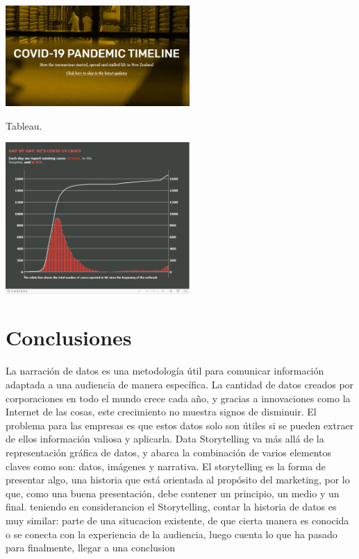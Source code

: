 \documentclass[twoside,twocolumn]{article}
\begin{document}
\includegraphics[width=7cm]{imagenes/img13.png}

Tableau. 

\includegraphics[width=7cm]{imagenes/img14.png}

\section{Conclusiones}
La narración de datos es una metodología útil para comunicar información adaptada a una audiencia de manera específica. La cantidad de datos creados por corporaciones en todo el mundo crece cada año, y gracias a innovaciones como la Internet de las cosas, este crecimiento no muestra signos de disminuir. El problema para las empresas es que estos datos solo son útiles si se pueden extraer de ellos información valiosa y aplicarla.
Data Storytelling va más allá de la representación gráfica de datos, y abarca la combinación de varios elementos claves como son: datos, imágenes y narrativa.
El storytelling es la forma de presentar algo, una historia que está orientada al propósito del marketing, por lo que, como una buena presentación, debe contener un principio, un medio y un final.
teniendo en considerancion el Storytelling, contar la historia de datos es muy similar: parte de una situcacion existente, de que cierta manera es conocida o se conecta con la experiencia de la audiencia, luego cuenta lo que ha pasado para finalmente, llegar a una conclusion
\end{document}
